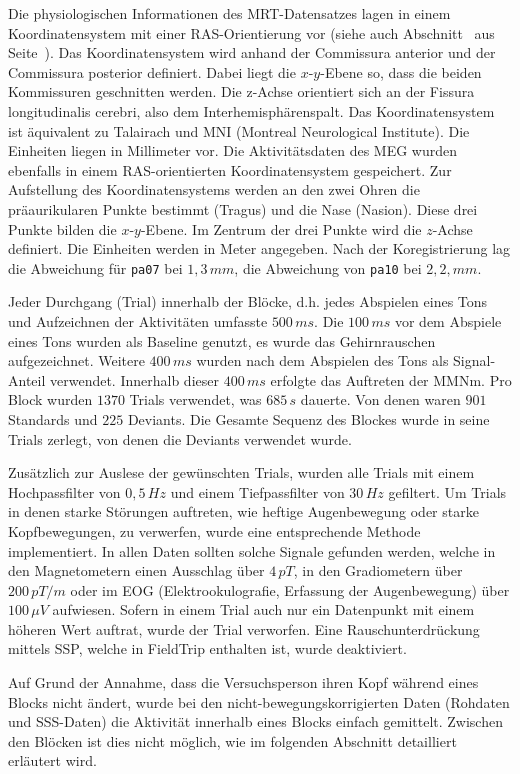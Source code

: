 \documentclass[doc,a4paper,12pt]{apa6}
\makeatletter
\DeclareRobustCommand*{\nameref}[1]{%
      \glqq{\myorg@nameref{#1}}\grqq%
    }%
\makeatother
\begin{document}
Die physiologischen Informationen des MRT-Datensatzes lagen in einem Koordinatensystem mit einer RAS-Orientierung vor (siehe auch Abschnitt~\nameref{sec:coreg} aus Seite~\pageref{sec:coreg}). Das Koordinatensystem wird anhand der Commissura anterior und der Commissura posterior definiert. Dabei liegt die $x$-$y$-Ebene so, dass die beiden Kommissuren geschnitten werden. Die z-Achse orientiert sich an der Fissura longitudinalis cerebri, also dem Interhemisphärenspalt. Das Koordinatensystem ist äquivalent zu Talairach und MNI (Montreal Neurological Institute). Die Einheiten liegen in Millimeter vor. Die Aktivitätsdaten des MEG wurden ebenfalls in einem RAS-orientierten Koordinatensystem gespeichert. Zur Aufstellung des Koordinatensystems werden an den zwei Ohren die präaurikularen Punkte bestimmt (Tragus) und die Nase (Nasion). Diese drei Punkte bilden die $x$-$y$-Ebene. Im Zentrum der drei Punkte wird die $z$-Achse definiert. Die Einheiten werden in Meter angegeben. Nach der Koregistrierung lag die Abweichung für \texttt{pa07} bei $1,3\,mm$, die Abweichung von \texttt{pa10} bei $2,2,mm$.

Jeder Durchgang (Trial) innerhalb der Blöcke, d.h. jedes Abspielen eines Tons und Aufzeichnen der Aktivitäten umfasste $500\,ms$. Die $100\,ms$ vor dem Abspiele eines Tons wurden als Baseline genutzt, es wurde das Gehirnrauschen aufgezeichnet. Weitere $400\,ms$ wurden nach dem Abspielen des Tons als Signal-Anteil verwendet. Innerhalb dieser $400\,ms$ erfolgte das Auftreten der MMNm. Pro Block wurden $1370$ Trials verwendet, was $685\,s$ dauerte. Von denen waren $901$ Standards und $225$ Deviants. Die Gesamte Sequenz des Blockes wurde in seine Trials zerlegt, von denen die Deviants verwendet wurde.

Zusätzlich zur Auslese der gewünschten Trials, wurden alle Trials mit einem Hochpassfilter von $0,5\,Hz$ und einem Tiefpassfilter von $30\,Hz$ gefiltert. Um Trials in denen starke Störungen auftreten, wie heftige Augenbewegung oder starke Kopfbewegungen, zu verwerfen, wurde eine entsprechende Methode implementiert. In allen Daten sollten solche Signale gefunden werden, welche in den Magnetometern einen Ausschlag über $4\,pT$, in den Gradiometern über $200\,pT/m$ oder im EOG (Elektrookulografie, Erfassung der Augenbewegung) über $100\,\mu V$ aufwiesen. Sofern in einem Trial auch nur ein Datenpunkt mit einem höheren Wert auftrat, wurde der Trial verworfen. Eine Rauschunterdrückung mittels SSP, welche in FieldTrip enthalten ist, wurde deaktiviert.

Auf Grund der Annahme, dass die Versuchsperson ihren Kopf während eines Blocks nicht ändert, wurde bei den nicht-bewegungskorrigierten Daten (Rohdaten und SSS-Daten) die Aktivität innerhalb eines Blocks einfach gemittelt. Zwischen den Blöcken ist dies nicht möglich, wie im folgenden Abschnitt detailliert erläutert wird.
\end{document}
